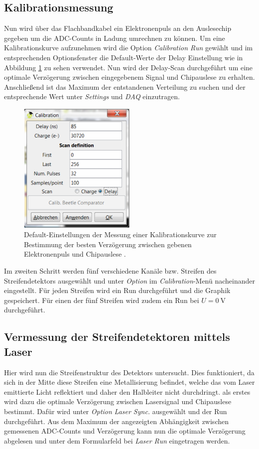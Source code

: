 \subsection{Kalibrationsmessung}
\label{sec:Kalibrationsmessung}
Nun wird über das Flachbandkabel ein Elektronenpuls an den Auslesechip gegeben
um die ADC-Counts in Ladung umrechnen zu können. Um eine Kalibrationskurve
aufzunehmen wird die Option \textit{Calibration Run} gewählt und im entsprechenden
Optionsfenster die Default-Werte der Delay Einstellung wie in Abbildung
\ref{fig:calibration} zu sehen verwendet. Nun wird der Delay-Scan durchgeführt
um eine optimale Verzögerung zwischen eingegebenem Signal und Chipauslese zu
erhalten. Anschließend ist das Maximum der entstandenen Verteilung zu suchen und
der entsprechende Wert unter \textit{Settings} und \textit{DAQ} einzutragen.
\begin{figure}[htb]
  \centering
  \includegraphics[width=0.5\textwidth]{images/Calibration.png}
  \caption{Default-Einstellungen der Messung einer Kalibrationskurve zur Bestimmung der besten Verzögerung zwischen gebenen Elektronenpuls und Chipauslese \cite{anleitung}.}
  \label{fig:calibration}
\end{figure}

Im zweiten Schritt werden fünf verschiedene Kanäle bzw. Streifen des Streifendetektors
ausgewählt und unter \textit{Option} im \textit{Calibration}-Menü nacheinander
eingestellt. Für jeden Streifen wird ein Run durchgeführt und die Graphik gespeichert.
Für einen der fünf Streifen wird zudem ein Run bei $U=\SI{0}{\volt}$ durchgeführt.


\subsection{Vermessung der Streifendetektoren mittels Laser}
\label{sec:Vermessung_Laser}
Hier wird nun die Streifenstruktur des Detektors untersucht. Dies funktioniert,
da sich in der Mitte diese Streifen eine Metallisierung befindet, welche das vom
Laser emittierte Licht reflektiert und daher den Halbleiter nicht durchdringt.
als erstes wird dazu die optimale Verzögerung zwischen Lasersignal und Chipauslese
bestimmt. Dafür wird unter \textit{Option} \textit{Laser Sync.} ausgewählt und
der Run durchgeführt. Aus dem Maximum der angezeigten Abhängigkeit zwischen
gemessenen ADC-Counts und Verzögerung kann nun die optimale Verzögerung abgelesen
und unter dem Formularfeld bei \textit{Laser Run} eingetragen werden.


